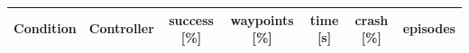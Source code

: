 \begin{tabular}{llccccc}\toprule
Condition & Controller & success [\%] & waypoints [\%] & time [s] & crash [\%] & episodes\\\midrule

\bottomrule\end{tabular}
